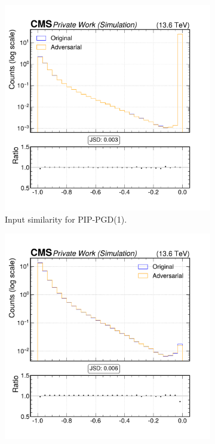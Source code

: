\begin{figure}[h]
  \centering
  \begin{subfigure}[t]{0.32\textwidth}
    \includegraphics[width=\linewidth]{media/output/features/compare/combined_it_1/cmp_npf_arr_Npfcan_ptrel.pdf}
    \caption*{Input similarity for PIP-PGD(1).}
  \end{subfigure}\hfill
  \begin{subfigure}[t]{0.32\textwidth}
    \includegraphics[width=\linewidth]{media/output/features/compare/combined_it_2/cmp_npf_arr_Npfcan_ptrel.pdf}

\end{subfigure}
\end{figure}
